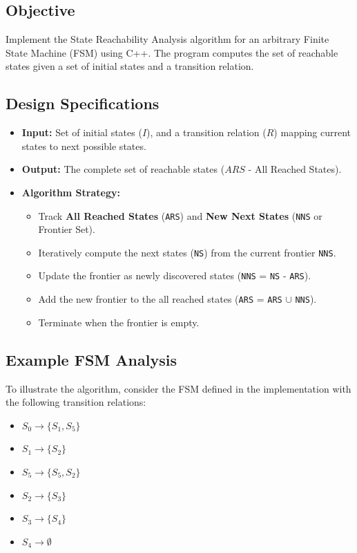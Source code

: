 \documentclass[12pt,a4paper]{article}
\begin{document}
\subsection{Objective}
Implement the State Reachability Analysis algorithm for an arbitrary Finite State Machine (FSM) using C++. The program computes the set of reachable states given a set of initial states and a transition relation.

\subsection{Design Specifications}
\begin{itemize}
    \item \textbf{Input:} Set of initial states ($I$), and a transition relation ($R$) mapping current states to next possible states.
    \item \textbf{Output:} The complete set of reachable states ($ARS$ - All Reached States).
    \item \textbf{Algorithm Strategy:}
    \begin{itemize}
        \item Track \textbf{All Reached States} (\texttt{ARS}) and \textbf{New Next States} (\texttt{NNS} or Frontier Set).
        \item Iteratively compute the next states (\texttt{NS}) from the current frontier \texttt{NNS}.
        \item Update the frontier as newly discovered states (\texttt{NNS} = \texttt{NS} - \texttt{ARS}).
        \item Add the new frontier to the all reached states (\texttt{ARS} = \texttt{ARS} $\cup$ \texttt{NNS}).
        \item Terminate when the frontier is empty.
    \end{itemize}
\end{itemize}

\subsection{Example FSM Analysis}

To illustrate the algorithm, consider the FSM defined in the implementation with the following transition relations:
\begin{itemize}
    \item $S_0 \rightarrow \{S_1, S_5\}$
    \item $S_1 \rightarrow \{S_2\}$
    \item $S_5 \rightarrow \{S_5, S_2\}$
    \item $S_2 \rightarrow \{S_3\}$
    \item $S_3 \rightarrow \{S_4\}$
    \item $S_4 \rightarrow \emptyset$
\end{itemize}
\end{document}
